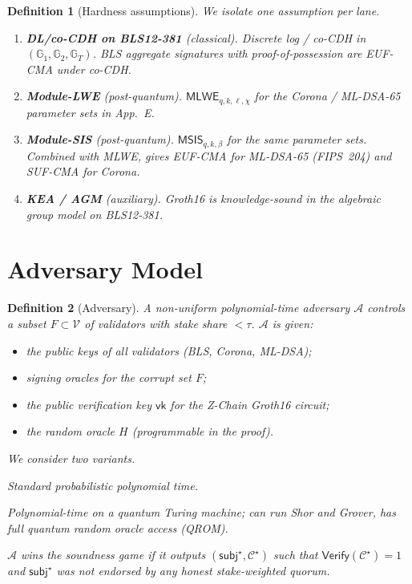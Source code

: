 \documentclass[11pt]{article}
\newtheorem{definition}{Definition}
\begin{document}
\begin{definition}[Hardness assumptions]
\label{def:assumptions}
We isolate one assumption per lane.
\begin{enumerate}[nosep]
  \item \textbf{DL/co-CDH on BLS12-381} (classical).  Discrete log /
    co-CDH in $(\mathbb{G}_1, \mathbb{G}_2, \mathbb{G}_T)$.  BLS
    aggregate signatures with proof-of-possession are EUF-CMA under
    co-CDH.
  \item \textbf{Module-LWE} (post-quantum).  $\mathsf{MLWE}_{q,k,\ell,
    \chi}$ for the Corona / ML-DSA-65 parameter sets in App.~E.
  \item \textbf{Module-SIS} (post-quantum).  $\mathsf{MSIS}_{q,k,\beta}$
    for the same parameter sets.  Combined with MLWE, gives EUF-CMA for
    ML-DSA-65 (FIPS~204) and SUF-CMA for Corona.
  \item \textbf{KEA / AGM} (auxiliary).  Groth16 is knowledge-sound in
    the algebraic group model on BLS12-381.
\end{enumerate}
\end{definition}

\section{Adversary Model}
\label{sec:adv}

\begin{definition}[Adversary]
\label{def:adv}
A non-uniform polynomial-time adversary $\mathcal{A}$ controls a
subset $F \subset \mathcal{V}$ of validators with stake share $< \tau$.
$\mathcal{A}$ is given:
\begin{itemize}[nosep]
  \item the public keys of all validators (BLS, Corona, ML-DSA);
  \item signing oracles for the corrupt set $F$;
  \item the public verification key $\mathsf{vk}$ for the Z-Chain
    Groth16 circuit;
  \item the random oracle $H$ (programmable in the proof).
\end{itemize}
We consider two variants.
\begin{description}[nosep]
  \item[$\mathcal{A}_C$ -- classical PPT.]  Standard probabilistic
    polynomial time.
  \item[$\mathcal{A}_Q$ -- quantum PPT.]  Polynomial-time on a quantum
    Turing machine; can run Shor and Grover, has full quantum random
    oracle access (QROM).
\end{description}
$\mathcal{A}$ \emph{wins} the soundness game if it outputs
$(\mathsf{subj}^\star, \mathcal{C}^\star)$ such that
$\mathsf{Verify}(\mathcal{C}^\star) = 1$ and $\mathsf{subj}^\star$ was
not endorsed by any honest stake-weighted quorum.
\end{definition}
\end{document}
